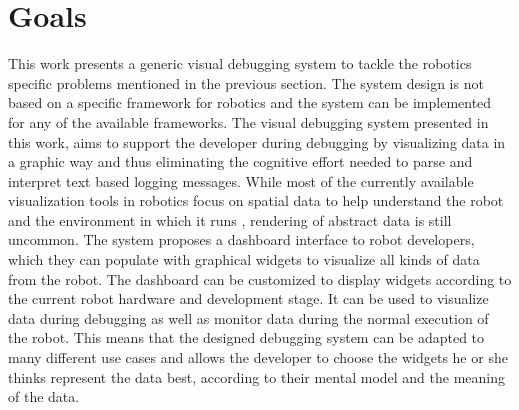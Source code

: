 \section{Goals}
This work presents a generic visual debugging system to tackle the robotics specific problems mentioned in the previous section. The system design is not based on a specific framework for robotics and the system can be implemented for any of the available frameworks. The visual debugging system presented in this work, aims to support the developer during debugging by visualizing data in a graphic way and thus eliminating the cognitive effort needed to parse and interpret text based logging messages. While most of the currently available visualization tools in robotics focus on spatial data to help understand the robot and the environment in which it runs \cite{Collett2010, Quigley2009}, rendering of abstract data is still uncommon. The system proposes a dashboard interface to robot developers, which they can populate with graphical widgets to visualize all kinds of data from the robot. The dashboard can be customized to display widgets according to the current robot hardware and development stage. It can be used to visualize data during debugging as well as monitor data during the normal execution of the robot. This means that the designed debugging system can be adapted to many different use cases and allows the developer to choose the widgets he or she thinks represent the data best, according to their mental model and the meaning of the data.




